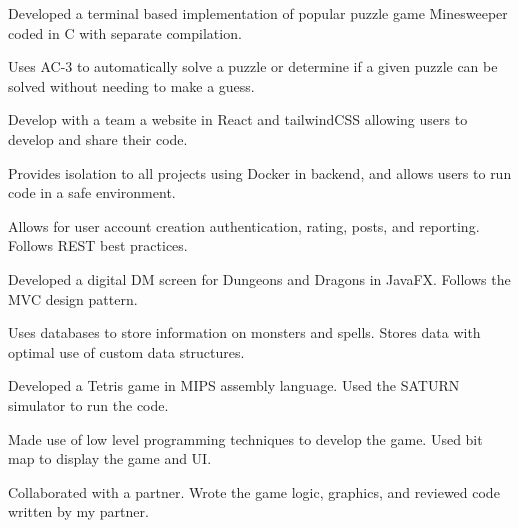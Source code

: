 \documentclass[letterpaper,10pt]{article}
\begin{document}
    \begin{resume_list}
        \item Developed a terminal based implementation of popular puzzle game Minesweeper coded in C with separate compilation.
        \item Uses AC-3 to automatically solve a puzzle or determine if a given puzzle can be solved without needing to make a guess.
    \end{resume_list}

    \begin{resume_list}
        \item Develop with a team a website in React and tailwindCSS allowing users to develop and share their code.
        \item Provides isolation to all projects using Docker in backend, and allows users to run code in a safe environment.
        \item Allows for user account creation authentication, rating, posts, and reporting. Follows REST best practices.
    \end{resume_list}
    \begin{resume_list}
        \item Developed a digital DM screen for Dungeons and Dragons in JavaFX. Follows the MVC design pattern.
        \item Uses databases to store information on monsters and spells. Stores data with optimal use of custom data structures.        
    \end{resume_list}
    \begin{resume_list}
        \item Developed a Tetris game in MIPS assembly language. Used the SATURN simulator to run the code.
        \item Made use of low level programming techniques to develop the game. Used bit map to display the game and UI.
        \item Collaborated with a partner. Wrote the game logic, graphics, and reviewed code written by my partner.
    \end{resume_list}  
    
\end{document}
